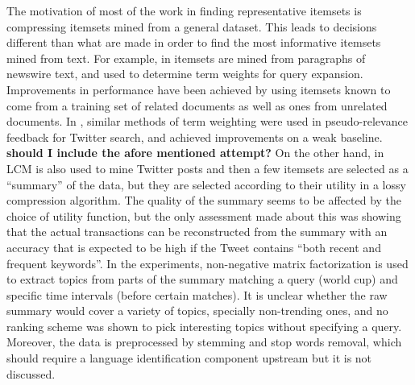\documentclass{sig-alternate}
\begin{document}
The motivation of most of the work in finding representative itemsets is compressing itemsets mined from a general dataset. This leads to decisions different than what  are made in order to find the most informative itemsets mined from text.
For example, in \cite{li2010mining} itemsets are mined from paragraphs of newswire text, and used to determine term weights for query expansion. Improvements in performance have been achieved by using itemsets known to come from a training set of related documents as well as ones from unrelated documents. In \cite{laumicroblog}, similar methods of term weighting were used in pseudo-relevance feedback  for Twitter search, and achieved improvements on a weak baseline. \textbf{should I include the afore mentioned attempt?}
On the other hand, in %
\cite{yang2012framework} LCM is also used to mine Twitter posts and then a few itemsets are selected as a ``summary'' of the data, but they are selected according to their utility in a
lossy compression algorithm.
The quality of the summary seems to be affected by the choice of utility function, but the only assessment made about this was showing that the actual transactions can be reconstructed from the summary with an accuracy that is expected to be high if the Tweet contains ``both recent and frequent keywords''. In the experiments, non-negative matrix factorization is used to extract topics from parts of the summary matching a query (world cup) and specific time intervals (before certain matches). It is unclear whether the raw summary would cover a variety of topics, specially non-trending ones, and no ranking scheme was shown to pick interesting topics without specifying a query. Moreover, the data is preprocessed by stemming and stop words removal, which should require a language identification component upstream but it is not discussed.
\end{document}
